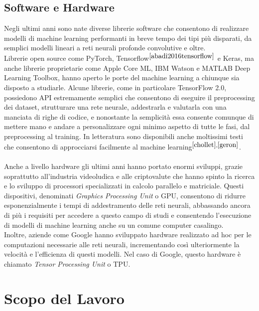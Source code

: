 \subsection{Software e Hardware}
Negli ultimi anni sono nate diverse librerie software che consentono di realizzare modelli di machine learning performanti in breve tempo dei tipi più disparati, da semplici modelli lineari a reti neurali profonde convolutive e oltre.\\
Librerie open source come PyTorch, Tensorflow$^{\cite{abadi2016tensorflow}}$ e Keras, ma anche librerie proprietarie come Apple Core ML, IBM Watson e MATLAB Deep Learning Toolbox, hanno aperto le porte del machine learning a chiunque sia disposto a studiarle. Alcune librerie, come in particolare TensorFlow 2.0, possiedono API estremamente semplici che consentono di eseguire il preprocessing dei dataset, strutturare una rete neurale, addestrarla e valutarla con una manciata di righe di codice, e nonostante la semplicità essa consente comunque di mettere mano e andare a personalizzare ogni minimo aspetto di tutte le fasi, dal preprocessing al training. In letteratura sono disponibili anche moltissimi testi che consentono di approcciarsi facilmente al machine learning$^{\cite{chollet},\cite{geron}}$.\\\\
Anche a livello hardware gli ultimi anni hanno portato enormi sviluppi, grazie soprattutto all'industria videoludica e alle criptovalute che hanno spinto la ricerca e lo sviluppo di processori specializzati in calcolo parallelo e matriciale. Questi dispositivi, denominati \textit{Graphics Processing Unit} o GPU, consentono di ridurre esponenzialmente i tempi di addestramento delle reti neurali, abbassando ancora di più i requisiti per accedere a questo campo di studi e consentendo l'esecuzione di modelli di machine learning anche su un comune computer casalingo.\\
Inoltre, aziende come Google hanno sviluppato hardware realizzato ad hoc per le computazioni necessarie alle reti neurali, incrementando così ulteriormente la velocità e l'efficienza di questi modelli. Nel caso di Google, questo hardware è chiamato \textit{Tensor Processing Unit} o TPU.
\pagebreak
\section{Scopo del Lavoro}
